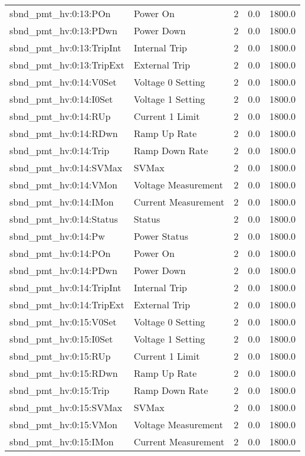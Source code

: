 \begin{center}
\begin{longtable}{l | l l l l }
sbnd\_pmt\_hv:0:13:POn & Power On & 2 & 0.0 & 1800.0\\ 
sbnd\_pmt\_hv:0:13:PDwn & Power Down & 2 & 0.0 & 1800.0\\ 
sbnd\_pmt\_hv:0:13:TripInt & Internal Trip & 2 & 0.0 & 1800.0\\ 
sbnd\_pmt\_hv:0:13:TripExt & External Trip & 2 & 0.0 & 1800.0\\ 
sbnd\_pmt\_hv:0:14:V0Set & Voltage 0 Setting & 2 & 0.0 & 1800.0\\ 
sbnd\_pmt\_hv:0:14:I0Set & Voltage 1 Setting & 2 & 0.0 & 1800.0\\ 
sbnd\_pmt\_hv:0:14:RUp & Current 1 Limit & 2 & 0.0 & 1800.0\\ 
sbnd\_pmt\_hv:0:14:RDwn & Ramp Up Rate & 2 & 0.0 & 1800.0\\ 
sbnd\_pmt\_hv:0:14:Trip & Ramp Down Rate & 2 & 0.0 & 1800.0\\ 
sbnd\_pmt\_hv:0:14:SVMax & SVMax & 2 & 0.0 & 1800.0\\ 
sbnd\_pmt\_hv:0:14:VMon & Voltage Measurement & 2 & 0.0 & 1800.0\\ 
sbnd\_pmt\_hv:0:14:IMon & Current Measurement & 2 & 0.0 & 1800.0\\ 
sbnd\_pmt\_hv:0:14:Status & Status & 2 & 0.0 & 1800.0\\ 
sbnd\_pmt\_hv:0:14:Pw & Power Status & 2 & 0.0 & 1800.0\\ 
sbnd\_pmt\_hv:0:14:POn & Power On & 2 & 0.0 & 1800.0\\ 
sbnd\_pmt\_hv:0:14:PDwn & Power Down & 2 & 0.0 & 1800.0\\ 
sbnd\_pmt\_hv:0:14:TripInt & Internal Trip & 2 & 0.0 & 1800.0\\ 
sbnd\_pmt\_hv:0:14:TripExt & External Trip & 2 & 0.0 & 1800.0\\ 
sbnd\_pmt\_hv:0:15:V0Set & Voltage 0 Setting & 2 & 0.0 & 1800.0\\ 
sbnd\_pmt\_hv:0:15:I0Set & Voltage 1 Setting & 2 & 0.0 & 1800.0\\ 
sbnd\_pmt\_hv:0:15:RUp & Current 1 Limit & 2 & 0.0 & 1800.0\\ 
sbnd\_pmt\_hv:0:15:RDwn & Ramp Up Rate & 2 & 0.0 & 1800.0\\ 
sbnd\_pmt\_hv:0:15:Trip & Ramp Down Rate & 2 & 0.0 & 1800.0\\ 
sbnd\_pmt\_hv:0:15:SVMax & SVMax & 2 & 0.0 & 1800.0\\ 
sbnd\_pmt\_hv:0:15:VMon & Voltage Measurement & 2 & 0.0 & 1800.0\\ 
sbnd\_pmt\_hv:0:15:IMon & Current Measurement & 2 & 0.0 & 1800.0\\ 

\end{longtable}
\end{center}
